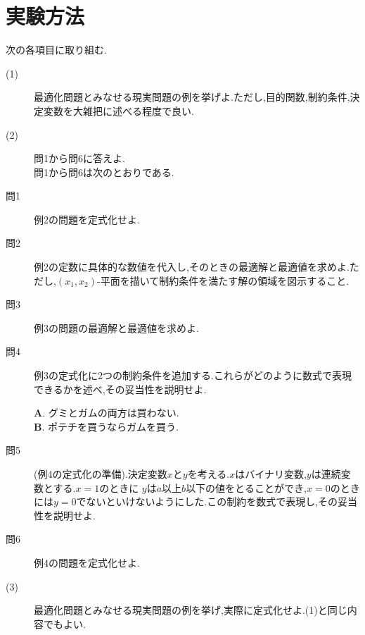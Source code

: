 \documentclass[12pt]{jarticle}
\begin{document}
\section{実験方法}
次の各項目に取り組む.
\begin{description}
	\item[(1)] 最適化問題とみなせる現実問題の例を挙げよ.ただし,目的関数,制約条件,決定変数を大雑把に述べる程度で良い.
	\item[(2)]問1から問6に答えよ.\\
	      問1から問6は次のとおりである.\\
	\item[問1] 例2の問題を定式化せよ.
	\item[問2] 例2の定数に具体的な数値を代入し,そのときの最適解と最適値を求めよ.ただし,$(x_1,x_2)$-平面を描いて制約条件を満たす解の領域を図示すること.
	\item[問3] 例3の問題の最適解と最適値を求めよ.
	\item[問4] 例3の定式化に2つの制約条件を追加する.これらがどのように数式で表現できるかを述べ,その妥当性を説明せよ.
	      \begin{center}
		      \textbf{A}. グミとガムの両方は買わない.\\
		      \textbf{B}. ポテチを買うならガムを買う.\\
	      \end{center}
	\item[問5] (例4の定式化の準備).決定変数$x$と$y$を考える.$x$はバイナリ変数,$y$は連続変数とする.$x=1$のときに
	      $y$は$a$以上$b$以下の値をとることができ,$x=0$のときには$y=0$でないといけないようにした.この制約を数式で表現し,その妥当性を説明せよ. 
	\item[問6] 例4の問題を定式化せよ.
	\item[(3)]最適化問題とみなせる現実問題の例を挙げ,実際に定式化せよ.(1)と同じ内容でもよい.
\end{description}
\end{document}
